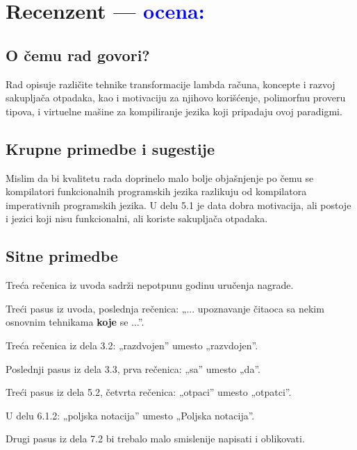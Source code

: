\documentclass[a4paper]{report}
\newcommand{\odgovor}[1]{\textcolor{blue}{#1}}
\begin{document}
\chapter{Recenzent \odgovor{--- ocena:} }


\section{O čemu rad govori?}
Rad opisuje različite tehnike transformacije lambda računa, koncepte i razvoj sakupljača otpadaka, kao i motivaciju za njihovo korišćenje, polimorfnu proveru tipova, i virtuelne mašine za kompiliranje jezika koji pripadaju ovoj paradigmi.

\section{Krupne primedbe i sugestije}
Mislim da bi kvalitetu rada doprinelo malo bolje objašnjenje po čemu se kompilatori funkcionalnih programskih jezika razlikuju od kompilatora imperativnih programskih jezika. U delu 5.1 je data dobra motivacija, ali postoje i jezici koji nisu funkcionalni, ali koriste sakupljača otpadaka.

\section{Sitne primedbe}
Treća rečenica iz uvoda sadrži nepotpunu godinu uručenja nagrade.

Treći pasus iz uvoda, poslednja rečenica: „... upoznavanje čitaoca sa nekim osnovnim tehnikama \textbf{koje} se ...”.

Treća rečenica iz dela 3.2: „razdvojen” umesto „razvdojen”.

Poslednji pasus iz dela 3.3, prva rečenica: „sa” umesto „da”.

Treći pasus iz dela 5.2, četvrta rečenica: „otpaci” umesto „otpatci”.

U delu 6.1.2: „poljska notacija” umesto „Poljska notacija”.

Drugi pasus iz dela 7.2 bi trebalo malo smislenije napisati i oblikovati.
\end{document}
